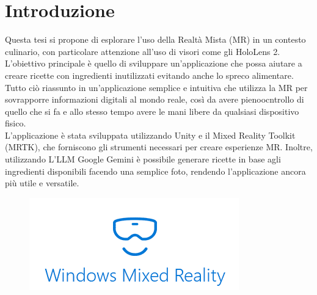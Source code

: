 \chapter{Introduzione}
\pagestyle{plain}
Questa tesi si propone di esplorare l'uso della Realtà Mista (MR) in un contesto culinario, con particolare attenzione all'uso di visori come gli HoloLens 2.\\ L'obiettivo principale è quello di sviluppare un'applicazione che possa aiutare a creare ricette con ingredienti inutilizzati evitando anche lo spreco alimentare. Tutto ciò riassunto in un'applicazione semplice e intuitiva che utilizza la MR per sovrapporre informazioni digitali al mondo reale, così da avere pienoocntrollo di quello che si fa e allo stesso tempo avere le mani libere da qualsiasi dispositivo fisico.\\
L'applicazione è stata sviluppata utilizzando Unity e il Mixed Reality Toolkit (MRTK), che forniscono gli strumenti necessari per creare esperienze MR. Inoltre, utilizzando L'LLM Google Gemini è possibile generare ricette in base agli ingredienti disponibili facendo una semplice foto, rendendo l'applicazione ancora più utile e versatile.
\begin{figure}[]
    \includegraphics{figures/chapter_1/Windows_Mixed_Reality_logo.png}
    \centering
\end{figure}


